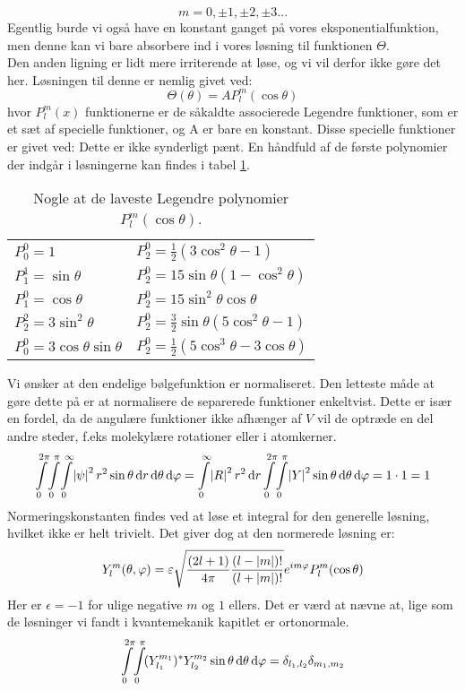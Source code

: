 \documentclass[../../Atom-ogMolekylefysik.tex]{subfiles}
\begin{document}
\begin{equation}
    m=0, \pm1, \pm2, \pm3... 
\end{equation}
Egentlig burde vi også have en konstant ganget på vores eksponentialfunktion, men denne kan vi bare absorbere ind i vores løsning til funktionen $\Theta$.\\
Den anden ligning er lidt mere irriterende at løse, og vi vil derfor ikke gøre det her. Løsningen til denne er nemlig givet ved:
\begin{equation}
    \Theta(\theta)=AP_{l}^{m}(\cos\theta)
\end{equation}
hvor $P_{l}^{m}(x)$ funktionerne er de såkaldte associerede Legendre funktioner, som er et sæt af specielle funktioner, og A er bare en konstant. Disse specielle funktioner er givet ved:
Dette er ikke synderligt pænt. En håndfuld af de første polynomier der indgår i løsningerne kan findes i tabel \ref{tab:AMO:legendre}.
\begin{table}[h]
    \centering
    \begin{tabular}{ll}
        $P_0^0 = 1$ & $P_2^0 = \frac{1}{2}(3\cos^2 \theta-1)$ \\
        $P_1^1 = \sin\theta$ & $P_2^0 = 15\sin\theta (1-\cos^2\theta)$ \\
        $P_1^0 = \cos \theta$ & $P_2^0 = 15\sin^2\theta \cos\theta$ \\
        $P_2^2 = 3\sin^2 \theta$ & $P_2^0 = \frac{3}{2}\sin\theta(5\cos^2\theta-1)$ \\
        $P_0^0 = 3\cos \theta\sin\theta$ & $P_2^0 = \frac{1}{2}(5\cos^3\theta-3\cos\theta)$ \\
    \end{tabular}
    \caption{Nogle at de laveste Legendre polynomier $P_l^m(\cos \theta)$.}
    \label{tab:AMO:legendre}
\end{table}
Vi ønsker at den endelige bølgefunktion er normaliseret. Den letteste måde at gøre dette på er at normalisere de separerede funktioner enkeltvist. Dette er især en fordel, da de angulære funktioner ikke afhænger af $V$ vil de optræde en del andre steder, f.eks molekylære rotationer eller i atomkerner.
$$
\integral{\integral{\integral{\abs{\psi}^2r^2\sin\theta}{r}{0}{\infty}}{\theta}{0}{\pi}}{\phi}{0}{2\pi}=\integral{\abs{R}^2r^2}{r}{0}{\infty}\integral{\integral{\abs{Y}^2\sin\theta}{\theta}{0}{\pi}}{\phi}{0}{2\pi}=1\cdot 1 = 1
$$
Normeringskonstanten findes ved at løse et integral for den generelle løsning, hvilket ikke er helt trivielt. Det giver dog at den normerede løsning er:
\begin{equation}
Y_l^m(\theta,\phi)=\epsilon\sqrt{\frac{(2l+1)}{4\pi}\frac{(l-\abs{m})!}{(l+\abs{m})!}}e^{im\phi}P_l^m(\cos\theta)
\end{equation}
Her er $\epsilon=-1$ for ulige negative $m$ og $1$ ellers.
Det er værd at nævne at, lige som de løsninger vi fandt i kvantemekanik kapitlet er ortonormale.
$$
\integral{\integral{(Y_{l_1}^{m_1})^*Y_{l_2}^{m_2}\sin\theta}{\theta}{0}{\pi}}{\phi}{0}{2\pi}=\delta_{l_1,l_2}\delta_{m_1,m_2}
$$
\end{document}
